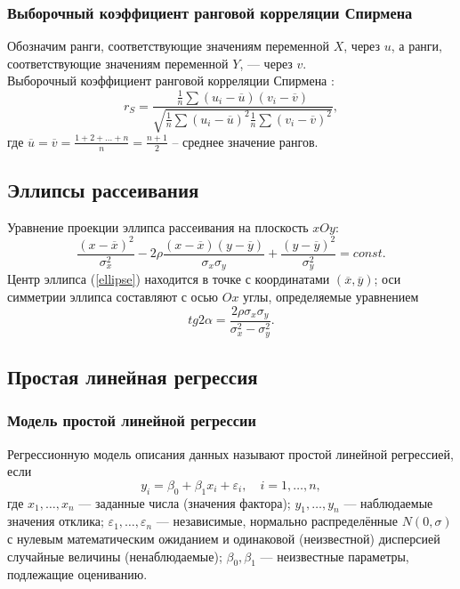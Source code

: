 \documentclass[12pt]{article}
\begin{document}
    \subsubsection{Выборочный коэффициент ранговой корреляции Спирмена}
    Обозначим ранги, соответствующие значениям переменной $X$, через $u$, а ранги, соответствующие значениям переменной $Y$, — через $v$.\\
    Выборочный коэффициент ранговой корреляции Спирмена \cite{theory}:
    \begin{equation}
        r_S = \frac{\frac{1}{n} \sum (u_i - \overline{u})(v_i - \overline{v})}{\sqrt{\frac{1}{n} \sum (u_i - \overline{u})^2 \frac{1}{n} \sum (v_i - \overline{v})^2}},
        \label{spirmen}
    \end{equation} 
    где $\overline{u} = \overline{v} = \frac{1 + 2 + ... + n}{n} = \frac{n+1}{2}$ -- среднее значение рангов.

\subsection{Эллипсы рассеивания}
Уравнение проекции эллипса рассеивания на плоскость $xOy$:
\begin{equation}
    \frac{(x-\overline{x})^2}{\sigma_x^2} - 2\rho\frac{(x-\overline{x})(y-\overline{y})}{\sigma_x\sigma_y} + \frac{(y-\overline{y})^2}{\sigma_y^2} = const.
    \label{ellipse}
\end{equation}
Центр эллипса (\ref{ellipse}) находится в точке с координатами $(\overline{x}, \overline{y})$; оси симметрии эллипса составляют с осью $Ox$ углы, определяемые уравнением
\begin{equation}
    tg 2\alpha = \frac{2\rho\sigma_x\sigma_y}{\sigma_x^2 - \sigma_y^2}.
\end{equation} 

\subsection{Простая линейная регрессия}

    \subsubsection{Модель простой линейной регрессии}
    Регрессионную модель описания данных называют простой линейной регрессией, если
    \begin{equation}
        y_i = \beta_0 + \beta_1x_i + \varepsilon_i, \quad i=1, \dots, n,
    \end{equation}
    где $x_1, \dots, x_n$ — заданные числа (значения фактора); $y_1, \dots, y_n$ — наблюдаемые значения отклика; $\varepsilon_1, \dots, \varepsilon_n$ — независимые, нормально распределённые $N(0,\sigma)$ с нулевым математическим ожиданием и одинаковой (неизвестной) дисперсией случайные величины (ненаблюдаемые); $\beta_0, \beta_1$ — неизвестные параметры, подлежащие оцениванию.
\end{document}
